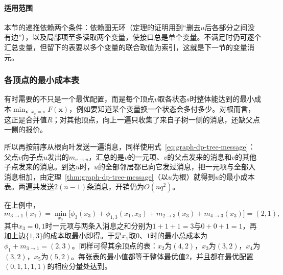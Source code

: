 \paragraph{适用范围}
本节的递推依赖两个条件：依赖图无环（定理的证明用到“删去$u$后各部分之间没有边”），以及局部项至多读取两个变量，使接口总是单个变量。不满足时仍可逐个汇总变量，但留下的表要以多个变量的联合取值为索引，这就是下一节的变量消元。

\subsubsection{各顶点的最小成本表}
\label{sec:graph-dp-tree-two-pass}

有时需要的不只是一个最优配置，而是每个顶点$v$取各状态$s$时整体能达到的最小成本$\min_{\bm x:\,x_v=s}F(\bm x)$，例如要知道某个变量换一个状态会多付多少。对根而言，这正是合并值$R$；对其他顶点，向上一遍只收集了来自子树一侧的消息，还缺父点一侧的报价。

所以再按前序从根向叶发送一遍消息，同样使用式~\eqref{eq:graph-dp-tree-message}：父点$v$向子点$u$发出的$m_{v\to u}$，汇总的是$v$的一元项、$v$的父点发来的消息和$v$的其他子点发来的消息。到达$u$时，$u$的全部邻居都已向它发过消息，把一元项与全部入消息相加，由定理~\ref{thm:graph-dp-tree-message}（以$u$为根）就得到$u$的最小成本表。两遍共发送$2(n-1)$条消息，开销仍为$O(nq^2)$。

在上例中，
\[
m_{3\to1}(x_1)=\min_{x_3}\bigl[\phi_3(x_3)+\phi_{1,3}(x_1,x_3)+m_{2\to3}(x_3)+m_{4\to3}(x_3)\bigr]=(2,1),
\]
其中$x_3=0,1$时一元项与两条入消息之和分别为$1+1+1=3$与$0+0+1=1$，再加上边$\{1,3\}$的成本取最小即得。于是$x_1$取$0$、$1$时的最小总成本为$\phi_1+m_{3\to1}=(2,3)$。同样可得其余顶点的表：$x_2$为$(4,2)$，$x_3$为$(3,2)$，$x_4$为$(3,2)$，$x_5$为$(5,2)$。每张表的最小值都等于整体最优值$2$，并且都在最优配置$(0,1,1,1,1)$的相应分量处达到。
